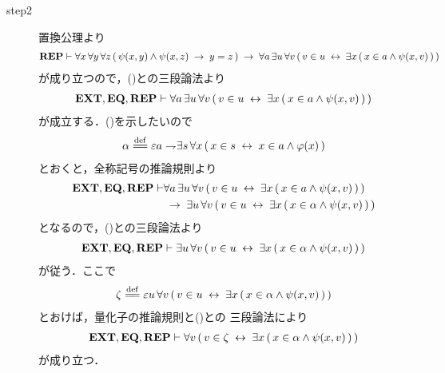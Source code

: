 \begin{sketch}
\begin{description}
			\item[step2]
				置換公理より
				\begin{align}
					\mbox{{\bf REP}} \vdash \forall x\, \forall y\, \forall z\, 
					(\, \psi(x,y) \wedge \psi(x,z)
					\hspace{0.25em}\rightarrow\hspace{0.25em} y = z\, )
					\hspace{0.25em}\rightarrow\hspace{0.25em} \forall a\, \exists u\, \forall v\,
					(\, v \in u \hspace{0.25em}\leftrightarrow\hspace{0.25em} \exists x\, (\, x \in a \wedge 
					\psi(x,v)\, )\, )
				\end{align}
				が成り立つので，()との三段論法より
				\begin{align}
					\mbox{{\bf EXT}},\mbox{{\bf EQ}},\mbox{{\bf REP}} \vdash \forall a\, \exists u\, \forall v\,
					(\, v \in u \hspace{0.25em}\leftrightarrow\hspace{0.25em} \exists x\, (\, x \in a \wedge 
					\psi(x,v)\, )\, )
					\label{fom:thm_axiom_of_separation_2}
				\end{align}
				が成立する．()を示したいので
				\begin{align}
					\alpha \defeq \varepsilon a \negation \exists s\, \forall x\,
					(\, x \in s \lrarrow x \in a \wedge \varphi(x)\, )
				\end{align}
				とおくと，全称記号の推論規則より
				\begin{align}
					\mbox{{\bf EXT}},\mbox{{\bf EQ}},\mbox{{\bf REP}} \vdash &\forall a\, \exists u\, \forall v\,
					(\, v \in u \hspace{0.25em}\leftrightarrow\hspace{0.25em} \exists x\, (\, x \in a \wedge 
					\psi(x,v)\, )\, ) \\
					&\hspace{0.25em}\rightarrow\hspace{0.25em} \exists u\, \forall v\,
					(\, v \in u \hspace{0.25em}\leftrightarrow\hspace{0.25em} \exists x\, (\, x \in \alpha \wedge 
					\psi(x,v)\, )\, )
				\end{align}
				となるので，()との三段論法より
				\begin{align}
					\mbox{{\bf EXT}},\mbox{{\bf EQ}},\mbox{{\bf REP}} \vdash \exists u\, \forall v\,
					(\, v \in u \hspace{0.25em}\leftrightarrow\hspace{0.25em} \exists x\, (\, x \in \alpha \wedge 
					\psi(x,v)\, )\, )
					\label{fom:thm_axiom_of_separation_3}
				\end{align}
				が従う．ここで
				\begin{align}
					\zeta \defeq \varepsilon u\, \forall v\,
					(\, v \in u \lrarrow \exists x\, (\, x \in \alpha \wedge 
					\psi(x,v)\, )\, )
				\end{align}
				とおけば，量化子の推論規則と()との
				三段論法により
				\begin{align}
					\mbox{{\bf EXT}},\mbox{{\bf EQ}},\mbox{{\bf REP}} \vdash \forall v\,
					(\, v \in \zeta \hspace{0.25em}\leftrightarrow\hspace{0.25em} \exists x\, (\, x \in \alpha \wedge 
					\psi(x,v)\, )\, )
					\label{fom:thm_axiom_of_separation_4}
				\end{align}
				が成り立つ．
			

\end{description}
\end{sketch}
